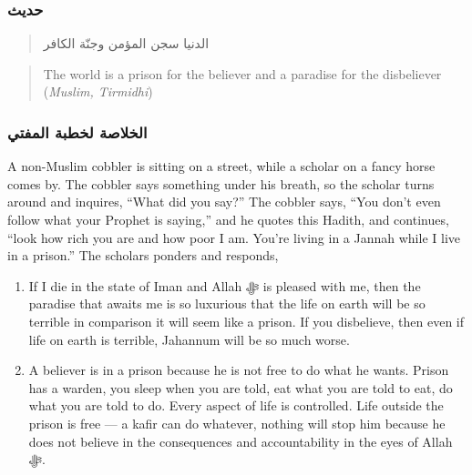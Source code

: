 \documentclass[
]{book}
\providecommand{\tightlist}{%
  \setlength{\itemsep}{0pt}\setlength{\parskip}{0pt}}
\begin{document}
\hypertarget{ux62dux62fux64aux62b-9}{%
\subsubsection{حديث}\label{ux62dux62fux64aux62b-9}}

\begin{quote}
الدنيا سجن المؤمن وجنّة الكافر
\end{quote}

\begin{quote}
The world is a prison for the believer and a paradise for the disbeliever (\emph{Muslim, Tirmidhi})
\end{quote}

\hypertarget{ux627ux644ux62eux644ux627ux635ux629-ux644ux62eux637ux628ux629-ux627ux644ux645ux641ux62aux64a-9}{%
\subsubsection{الخلاصة لخطبة المفتي}\label{ux627ux644ux62eux644ux627ux635ux629-ux644ux62eux637ux628ux629-ux627ux644ux645ux641ux62aux64a-9}}

A non-Muslim cobbler is sitting on a street, while a scholar on a fancy horse comes by. The cobbler says something under his breath, so the scholar turns around and inquires, ``What did you say?'' The cobbler says, ``You don't even follow what your Prophet is saying,'' and he quotes this Hadith, and continues, ``look how rich you are and how poor I am. You're living in a Jannah while I live in a prison.'' The scholars ponders and responds,

\begin{enumerate}
\def\labelenumi{\arabic{enumi}.}
\tightlist
\item
  If I die in the state of Iman and Allah ﷻ is pleased with me, then the paradise that awaits me is so luxurious that the life on earth will be so terrible in comparison it will seem like a prison. If you disbelieve, then even if life on earth is terrible, Jahannum will be so much worse.
\item
  A believer is in a prison because he is not free to do what he wants. Prison has a warden, you sleep when you are told, eat what you are told to eat, do what you are told to do. Every aspect of life is controlled. Life outside the prison is free --- a kafir can do whatever, nothing will stop him because he does not believe in the consequences and accountability in the eyes of Allah ﷻ.
\end{enumerate}
\end{document}
